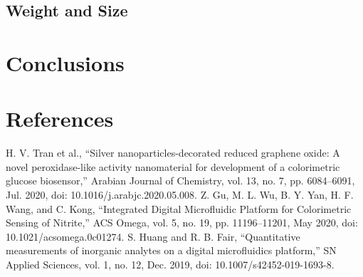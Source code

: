 \documentclass[conference]{IEEEtran}
\begin{document}
\subsection{Weight and Size}

\section{Conclusions}

\section*{References}


\begin{thebibliography}{00}
 H. V. Tran et al., “Silver nanoparticles-decorated reduced graphene oxide: A novel peroxidase-like activity nanomaterial for development of a colorimetric glucose biosensor,” Arabian Journal of Chemistry, vol. 13, no. 7, pp. 6084–6091, Jul. 2020, doi: 10.1016/j.arabjc.2020.05.008.
 Z. Gu, M. L. Wu, B. Y. Yan, H. F. Wang, and C. Kong, “Integrated Digital Microfluidic Platform for Colorimetric Sensing of Nitrite,” ACS Omega, vol. 5, no. 19, pp. 11196–11201, May 2020, doi: 10.1021/acsomega.0c01274.
 S. Huang and R. B. Fair, “Quantitative measurements of inorganic analytes on a digital microfluidics platform,” SN Applied Sciences, vol. 1, no. 12, Dec. 2019, doi: 10.1007/s42452-019-1693-8.
\end{thebibliography}
\end{document}
